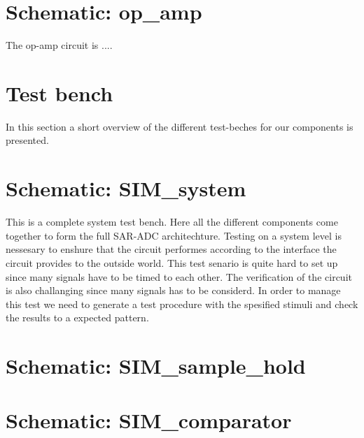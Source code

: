 \documentclass[english, a4paper,11pt]{article}
\begin{document}
\section*{Schematic: op\_amp}
The op-amp circuit is ....

\section{Test bench}
In this section a short overview of the different test-beches for our components is presented.


\section*{Schematic: SIM\_system}
This is a complete system test bench. Here all the different components come together to form the full SAR-ADC architechture. 
Testing on a system level is nessesary to enshure that the circuit performes according to the interface the circuit provides to the outside world.
This test senario is quite hard to set up since many signals have to be timed to each other. The verification of the circuit is also challanging since many signals has to be considerd.
In order to manage this test we need to generate a test procedure with the spesified stimuli and check the results to a expected pattern.

\section*{Schematic: SIM\_sample\_hold}



\section*{Schematic: SIM\_comparator}
\end{document}
